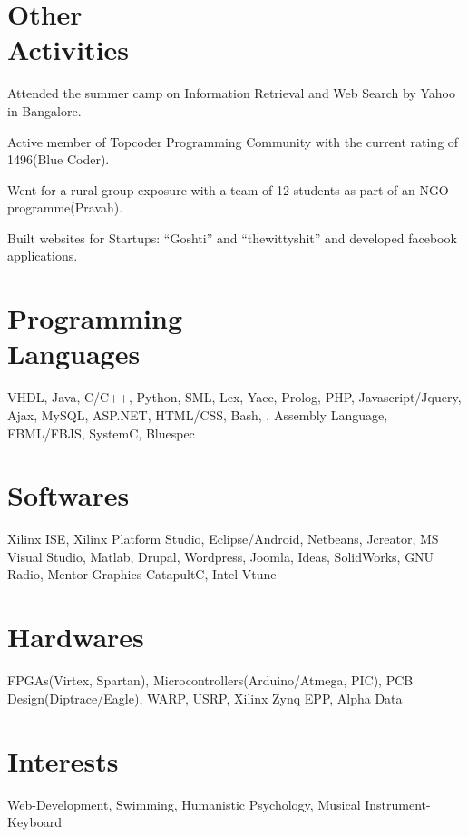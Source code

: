 \documentclass[margin,line]{resume}
\begin{document}
\begin{resume}
    \section{\mysidestyle Other \\Activities}
    \begin{list2}
      \setlength{\itemindent}{-0.63em}
	\item Attended the summer camp on Information Retrieval and Web Search by Yahoo in Bangalore.%
	\item Active member of Topcoder Programming Community with the current rating of 1496(Blue Coder).%
	\item Went for a rural group exposure with a team of 12 students as part of an NGO programme(Pravah).%
	\item Built websites for Startups: ``Goshti'' and ``thewittyshit'' and developed facebook applications.%
    \end{list2}		\vspace{1mm}
 
    
    \section{\mysidestyle Programming \\Languages} 
    VHDL, Java, C/C++, Python, SML, Lex, Yacc, Prolog, PHP, Javascript/Jquery, Ajax, MySQL, ASP.NET, HTML/CSS, Bash, \LaTeXe, Assembly Language, FBML/FBJS, SystemC, Bluespec

    \section{\mysidestyle Softwares} 
    Xilinx ISE, Xilinx Platform Studio, Eclipse/Android, Netbeans, Jcreator, MS Visual Studio, Matlab, Drupal, Wordpress, Joomla, Ideas, SolidWorks, GNU Radio, Mentor Graphics CatapultC, Intel Vtune

    \section{\mysidestyle Hardwares}
    FPGAs(Virtex, Spartan), Microcontrollers(Arduino/Atmega, PIC), PCB Design(Diptrace/Eagle), WARP, USRP, Xilinx Zynq EPP, Alpha Data

    \section{\mysidestyle Interests}
    Web-Development, Swimming, Humanistic Psychology, Musical Instrument- Keyboard	\vspace{1.5mm}

\end{resume}
\end{document}
